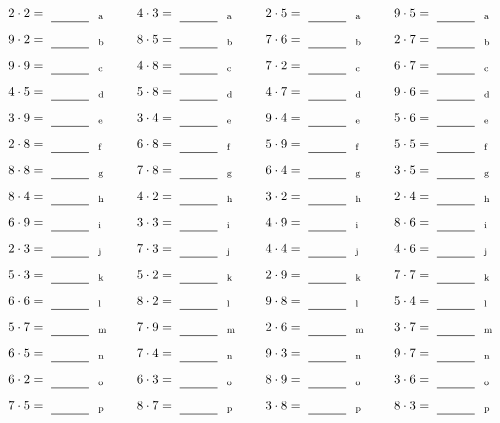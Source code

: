 \documentclass
[
  draft    = true,
  fontsize = 11pt,
  parskip  = half-
]
{scrartcl}
\begin{document}
\par\vfill\par
\begin{align*}
    \pline{2\cdot2}&=\rline{a}
  & \pline{4\cdot3}&=\rline{a}
  & \pline{2\cdot5}&=\rline{a}
  & \pline{9\cdot5}&=\rline{a} \\[1ex]
    \pline{9\cdot2}&=\rline{b}
  & \pline{8\cdot5}&=\rline{b}
  & \pline{7\cdot6}&=\rline{b}
  & \pline{2\cdot7}&=\rline{b} \\[1ex]
    \pline{9\cdot9}&=\rline{c}
  & \pline{4\cdot8}&=\rline{c}
  & \pline{7\cdot2}&=\rline{c}
  & \pline{6\cdot7}&=\rline{c} \\[1ex]
    \pline{4\cdot5}&=\rline{d}
  & \pline{5\cdot8}&=\rline{d}
  & \pline{4\cdot7}&=\rline{d}
  & \pline{9\cdot6}&=\rline{d} \\[1ex]
    \pline{3\cdot9}&=\rline{e}
  & \pline{3\cdot4}&=\rline{e}
  & \pline{9\cdot4}&=\rline{e}
  & \pline{5\cdot6}&=\rline{e} \\[1ex]
    \pline{2\cdot8}&=\rline{f}
  & \pline{6\cdot8}&=\rline{f}
  & \pline{5\cdot9}&=\rline{f}
  & \pline{5\cdot5}&=\rline{f} \\[1ex]
    \pline{8\cdot8}&=\rline{g}
  & \pline{7\cdot8}&=\rline{g}
  & \pline{6\cdot4}&=\rline{g}
  & \pline{3\cdot5}&=\rline{g} \\[1ex]
    \pline{8\cdot4}&=\rline{h}
  & \pline{4\cdot2}&=\rline{h}
  & \pline{3\cdot2}&=\rline{h}
  & \pline{2\cdot4}&=\rline{h} \\[1ex]
    \pline{6\cdot9}&=\rline{i}
  & \pline{3\cdot3}&=\rline{i}
  & \pline{4\cdot9}&=\rline{i}
  & \pline{8\cdot6}&=\rline{i} \\[1ex]
    \pline{2\cdot3}&=\rline{j}
  & \pline{7\cdot3}&=\rline{j}
  & \pline{4\cdot4}&=\rline{j}
  & \pline{4\cdot6}&=\rline{j} \\[1ex]
    \pline{5\cdot3}&=\rline{k}
  & \pline{5\cdot2}&=\rline{k}
  & \pline{2\cdot9}&=\rline{k}
  & \pline{7\cdot7}&=\rline{k} \\[1ex]
    \pline{6\cdot6}&=\rline{l}
  & \pline{8\cdot2}&=\rline{l}
  & \pline{9\cdot8}&=\rline{l}
  & \pline{5\cdot4}&=\rline{l} \\[1ex]
    \pline{5\cdot7}&=\rline{m}
  & \pline{7\cdot9}&=\rline{m}
  & \pline{2\cdot6}&=\rline{m}
  & \pline{3\cdot7}&=\rline{m} \\[1ex]
    \pline{6\cdot5}&=\rline{n}
  & \pline{7\cdot4}&=\rline{n}
  & \pline{9\cdot3}&=\rline{n}
  & \pline{9\cdot7}&=\rline{n} \\[1ex]
    \pline{6\cdot2}&=\rline{o}
  & \pline{6\cdot3}&=\rline{o}
  & \pline{8\cdot9}&=\rline{o}
  & \pline{3\cdot6}&=\rline{o} \\[1ex]
    \pline{7\cdot5}&=\rline{p}
  & \pline{8\cdot7}&=\rline{p}
  & \pline{3\cdot8}&=\rline{p}
  & \pline{8\cdot3}&=\rline{p}
\end{align*}
\end{document}
